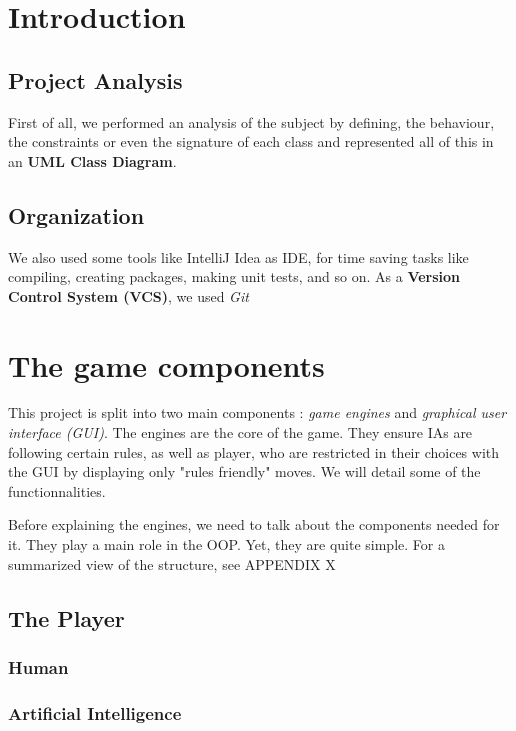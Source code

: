 \documentclass[english, 11pt, titlepage]{article}
\begin{document}
    

    \pagebreak
    \tableofcontents

    \pagebreak
    \section{Introduction}
    \subsection{Project Analysis}
    First of all, we performed an analysis of the subject by defining, the behaviour, the constraints or even the signature of each class and represented all of this in an \textbf{UML Class Diagram}.
    \subsection{Organization}
    We also used some tools like IntelliJ Idea as IDE, for time saving tasks like compiling, creating packages, making unit tests, and so on. As a \textbf{Version Control System (VCS)}, we used \emph{Git}

    \section{The game components}
    This project is split into two main components : \emph{game engines} and \emph{graphical user interface (GUI)}. The engines are the core of the game. They ensure IAs are following certain rules, as well as player, who are restricted in their choices with the GUI by displaying only "rules friendly" moves. We will detail some of the functionnalities.

    Before explaining the engines, we need to talk about the components needed for it. They play a main role in the OOP. Yet, they are quite simple. For a summarized view of the structure, see APPENDIX X

    \subsection{The Player}
    \subsubsection{Human}

    \subsubsection{Artificial Intelligence}
\end{document}
